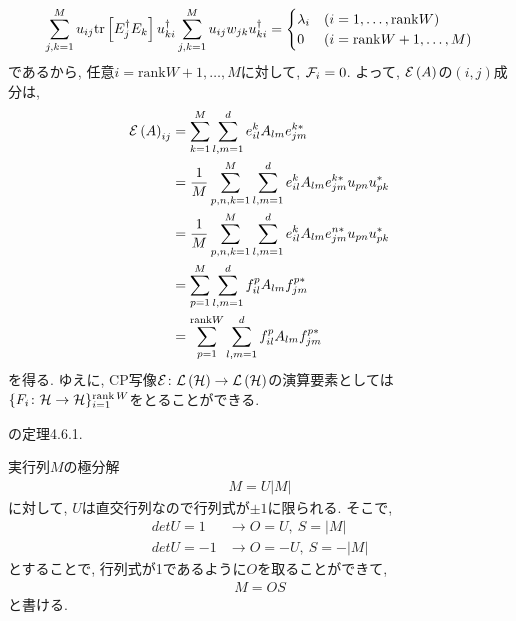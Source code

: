 \begin{ex}
\begin{align*}
        \sum_{j,k=1}^M
        u_{ij} \mathrm{tr}\left[ E_j^\dagger E_k\right] u^\dagger_{ki}
        \sum_{j,k=1}^M u_{ij} w_{jk} u^\dagger_{ki}
        =
        \begin{cases}
            \lambda_i  & ( i = 1, \dots, \mathrm{rank} W) \\
            0           & ( i = \mathrm{rank} W + 1, \dots , M)
        \end{cases}
    \end{align*}
    であるから, 任意$i = \mathrm{rank} W + 1, \dots , M $に対して, $\mathcal{F}_i = 0$.
    よって, $\mathcal{E} \left( A \right)$の$(i,j)$成分は,
    \begin{align*}
        \mathcal{E} \left( A \right)_{ij}
         & =
        \sum_{k=1}^M
        \sum_{l,m = 1}^d e_{il}^k A_{lm} {e_{jm}^{k*}}                  \\
         & =
         \frac{1}{M}
        \sum_{p,n, k=1}^M
        \sum_{l,m = 1}^d e_{il}^k A_{lm} {e_{jm}^{k*}}  u_{pn} u_{pk}^* \\
         & =
         \frac{1}{M}
        \sum_{p,n, k=1}^M
        \sum_{l,m = 1}^d e_{il}^k A_{lm} {e_{jm}^{n*}}  u_{pn} u_{pk}^* \\
         & =
        \sum_{p=1}^{M}
        \sum_{l,m = 1}^d f_{il}^{p} A_{lm} f_{jm}^{p*}                  \\
         & =
        \sum_{p=1}^{\mathrm{rank}W}
        \sum_{l,m = 1}^d f_{il}^{p} A_{lm} f_{jm}^{p*}                  \\
    \end{align*}
    を得る.
    ゆえに, CP写像$\mathcal{E} \colon \mathcal{L}\left({\mathcal{H}}\right) \to \mathcal{L}\left({\mathcal{H}}\right)$の演算要素としては$\{F_i \colon \mathcal{H} \to \mathcal{H} \}_{i=1}^{\operatorname{rank} W}$をとることができる.
\end{ex}

\begin{ex}
    \label{ex8.11}
    \cite{Ishizaka2012}の定理4.6.1.
\end{ex}

\begin{ex}
    \label{ex8.12}
   実行列$M$の極分解
    \begin{align*}
        M = U |M|
    \end{align*}
    に対して, $U$は直交行列なので行列式が$\pm1$に限られる. そこで,
    \begin{align*}
        det U = 1  & \to O = U, \ S = |M|   \\
        det U = -1 & \to O = -U, \ S = -|M|
    \end{align*}
    とすることで, 行列式が1であるように$O$を取ることができて,
    \begin{align*}
        M = OS
    \end{align*}
    と書ける.
\end{ex}

